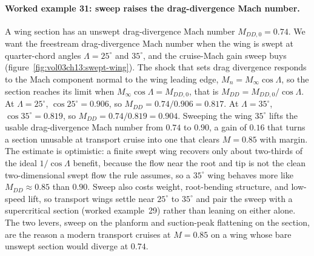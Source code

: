 \paragraph{Worked example 31: sweep raises the drag-divergence Mach
number.} A wing section has an unswept drag-divergence Mach number
$M_{DD,0} = 0.74$. We want the freestream drag-divergence Mach number
when the wing is swept at quarter-chord angles $\Lambda = 25^{\circ}$
and $35^{\circ}$, and the cruise-Mach gain sweep buys
(figure~\ref{fig:vol03ch13:swept-wing}). The shock that sets drag
divergence responds to the Mach component normal to the wing leading
edge, $M_n = M_\infty\cos\Lambda$, so the section reaches its limit when
$M_\infty\cos\Lambda = M_{DD,0}$, that is
$M_{DD} = M_{DD,0}/\cos\Lambda$. At $\Lambda = 25^{\circ}$,
$\cos 25^{\circ} = 0.906$, so $M_{DD} = 0.74/0.906 = 0.817$. At
$\Lambda = 35^{\circ}$, $\cos 35^{\circ} = 0.819$, so
$M_{DD} = 0.74/0.819 = 0.904$. Sweeping the wing $35^{\circ}$ lifts the
usable drag-divergence Mach number from $0.74$ to $0.90$, a gain of
$0.16$ that turns a section unusable at transport cruise into one that
clears $M = 0.85$ with margin. The estimate is optimistic: a finite
swept wing recovers only about two-thirds of the ideal
$1/\cos\Lambda$ benefit, because the flow near the root and tip is not
the clean two-dimensional swept flow the rule assumes, so a
$35^{\circ}$ wing behaves more like $M_{DD} \approx 0.85$ than $0.90$.
Sweep also costs weight, root-bending structure, and low-speed lift, so
transport wings settle near $25^{\circ}$ to $35^{\circ}$ and pair the
sweep with a supercritical section (worked example~29) rather than
leaning on either alone. The two levers, sweep on the planform and
suction-peak flattening on the section, are the reason a modern
transport cruises at $M = 0.85$ on a wing whose bare unswept section
would diverge at $0.74$.



